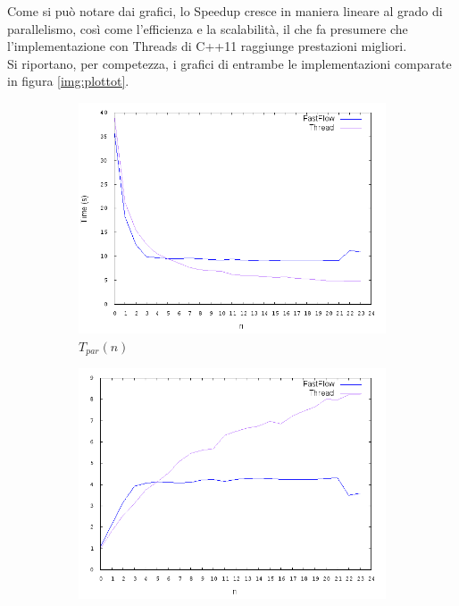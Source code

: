 \documentclass[12pt]{article}
\begin{document}
Come si pu\`o notare dai grafici, lo Speedup cresce in maniera lineare al grado di parallelismo, cos\`i come l'efficienza e la scalabilit\`a, il che fa presumere che l'implementazione con Threads di C++11 raggiunge prestazioni migliori.
\\Si riportano, per competezza, i grafici di entrambe le implementazioni comparate in figura \ref{img:plottot}.
\begin{figure}[!htbp]
\begin{subfigure}{.55\textwidth}
  \centering
  \includegraphics[scale=.35,keepaspectratio]{tc.png}
  \caption{$T_{par}(n)$}
  \label{fig:tisc}
\end{subfigure} 
\begin{subfigure}{.55\textwidth}
  \centering
  \includegraphics[scale=.35,keepaspectratio]{sp.png}

\end{subfigure}
\end{figure}
\end{document}

